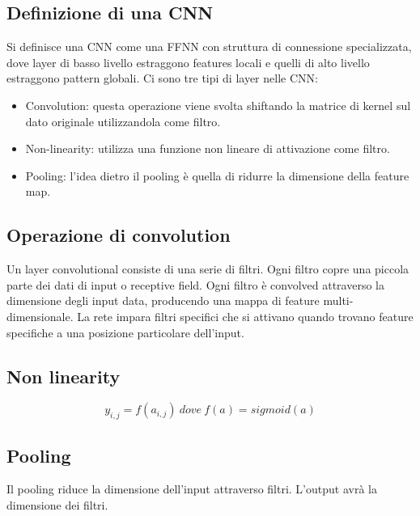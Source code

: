 		\subsection{Definizione di una CNN}
		Si definisce una CNN come una FFNN con struttura di connessione specializzata, dove layer di basso livello estraggono features locali e quelli di alto livello estraggono pattern globali.
		Ci sono tre tipi di layer nelle CNN:
		\begin{itemize}
			\item Convolution: questa operazione viene svolta shiftando la matrice di kernel sul dato originale utilizzandola come filtro.
			\item Non-linearity: utilizza una funzione non lineare di attivazione come filtro.
			\item Pooling: l'idea dietro il pooling \`e quella di ridurre la dimensione della feature map.
		\end{itemize}

		\subsection{Operazione di convolution}
		Un layer convolutional consiste di una serie di filtri.
		Ogni filtro copre una piccola parte dei dati di input o receptive field.
		Ogni filtro \`e convolved attraverso la dimensione degli input data, producendo una mappa di feature multi-dimensionale.
		La rete impara filtri specifici che si attivano quando trovano feature specifiche a una posizione particolare dell'input.

		\subsection{Non linearity}
		$$y_{i,j} = f(a_{i,j})\ dove\ f(a)= sigmoid(a)$$

		\subsection{Pooling}
		Il pooling riduce la dimensione dell'input attraverso filtri.
		L'output avr\`a la dimensione dei filtri.
